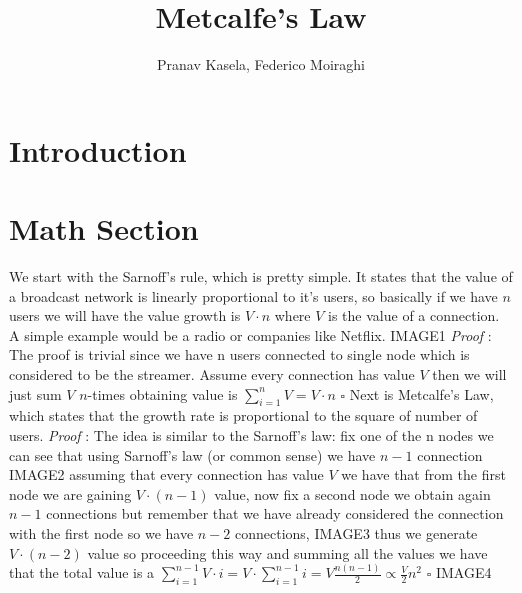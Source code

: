 \documentclass[12pt, a4page]{article}
\title{Metcalfe's Law}
\date{}
\author{Pranav Kasela, Federico Moiraghi}
\begin{document}
\maketitle
\part*{Introduction}

\part*{Math Section}
We start with the Sarnoff's rule, which is pretty simple. It states that the value of a broadcast network is linearly proportional to it's users, so basically if we have $n$ users we will have the value growth is $V \cdot n$ where $V$ is the value of a connection. A simple example would be a radio or companies like Netflix.
\newline IMAGE1 \newline
\textit{Proof} : The proof is trivial since we have n users connected to single node which is considered to be the streamer. Assume every connection has value $V$ then we will just sum $V$ $n$-times obtaining value is $\sum_{i=1}^{n} V = V \cdot n$ \hfill $\square$
\newline
\newline
Next is Metcalfe's Law, which states that the growth rate is proportional to the square of number of users.\newline
\textit{Proof} : The idea is similar to the Sarnoff's law: fix one of the n nodes we can see that using Sarnoff's law (or common sense) we have $n-1$ connection
IMAGE2 \newline
assuming that every connection has value $V$ we have that from the first node we are gaining $V \cdot (n - 1)$ value, now fix a second node we obtain again $n-1$ connections but remember that we have already considered the connection with the first node so we have $n-2$ connections,\newline
IMAGE3 \newline
thus we generate $V \cdot (n - 2)$ value so proceeding this way and summing all the values we have that the total value is a $\sum_{i=1}^{n-1} V \cdot i = V \cdot \sum_{i=1}^{n-1} i = V \frac{n(n-1)}{2} \propto \frac{V}{2} n^2$  \hfill $\square$
\newline IMAGE4 \newline
\end{document}
